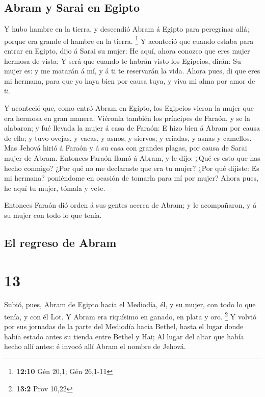 \hypertarget{abram-y-sarai-en-egipto}{%
\subsection{Abram y Sarai en Egipto}\label{abram-y-sarai-en-egipto}}

 Y hubo hambre en la tierra, y descendió Abram á Egipto
para peregrinar allá; porque era grande el hambre en la tierra.
\footnote{\textbf{12:10} Gén 20,1; Gén 26,1-11}  Y
aconteció que cuando estaba para entrar en Egipto, dijo á Sarai su
mujer: He aquí, ahora conozco que eres mujer hermosa de vista;
 Y será que cuando te habrán visto los Egipcios, dirán:
Su mujer es: y me matarán á mí, y á ti te reservarán la vida.
 Ahora pues, di que eres mi hermana, para que yo haya
bien por causa tuya, y viva mi alma por amor de ti.

 Y aconteció que, como entró Abram en Egipto, los
Egipcios vieron la mujer que era hermosa en gran manera. 
Viéronla también los príncipes de Faraón, y se la alabaron; y fué
llevada la mujer á casa de Faraón:  E hizo bien á Abram
por causa de ella; y tuvo ovejas, y vacas, y asnos, y siervos, y
criadas, y asnas y camellos.  Mas Jehová hirió á Faraón y
á su casa con grandes plagas, por causa de Sarai mujer de Abram.
 Entonces Faraón llamó á Abram, y le dijo: ¿Qué es esto
que has hecho conmigo? ¿Por qué no me declaraste que era tu mujer?
 ¿Por qué dijiste: Es mi hermana? poniéndome en ocasión
de tomarla para mí por mujer? Ahora pues, he aquí tu mujer, tómala y
vete.

 Entonces Faraón dió orden á sus gentes acerca de Abram;
y le acompañaron, y á su mujer con todo lo que tenía.

\hypertarget{el-regreso-de-abram}{%
\subsection{El regreso de Abram}\label{el-regreso-de-abram}}

\hypertarget{section-12}{%
\section{13}\label{section-12}}

 Subió, pues, Abram de Egipto hacia el Mediodía, él, y su
mujer, con todo lo que tenía, y con él Lot.  Y Abram era
riquísimo en ganado, en plata y oro. \footnote{\textbf{13:2} Prov 10,22}
 Y volvió por sus jornadas de la parte del Mediodía hacia
Bethel, hasta el lugar donde había estado antes su tienda entre Bethel y
Hai;  Al lugar del altar que había hecho allí antes: é
invocó allí Abram el nombre de Jehová.

